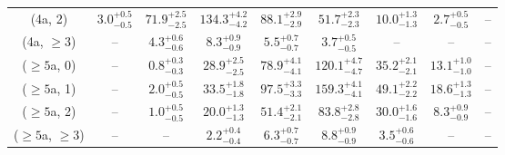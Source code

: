 \begin{table}[h!]
{\begin{tabular}{ccccccccc}
	(4a, 2) & $3.0^{+ 0.5 }_{- 0.5 }$ & $71.9^{+ 2.5 }_{- 2.5 }$ & $134.3^{+ 4.2 }_{- 4.2 }$ & $88.1^{+ 2.9 }_{- 2.9 }$ & $51.7^{+ 2.3 }_{- 2.3 }$ & $10.0^{+ 1.3 }_{- 1.3 }$ & $2.7^{+ 0.5 }_{- 0.5 }$ & -- \\[0.5ex] 
	(4a, $\ge3$) & -- & $4.3^{+ 0.6 }_{- 0.6 }$ & $8.3^{+ 0.9 }_{- 0.9 }$ & $5.5^{+ 0.7 }_{- 0.7 }$ & $3.7^{+ 0.5 }_{- 0.5 }$ & -- & -- & -- \\[0.5ex] 
	($\ge5$a, 0) & -- & $0.8^{+ 0.3 }_{- 0.3 }$ & $28.9^{+ 2.5 }_{- 2.5 }$ & $78.9^{+ 4.1 }_{- 4.1 }$ & $120.1^{+ 4.7 }_{- 4.7 }$ & $35.2^{+ 2.1 }_{- 2.1 }$ & $13.1^{+ 1.0 }_{- 1.0 }$ & -- \\[0.5ex] 
	($\ge5$a, 1) & -- & $2.0^{+ 0.5 }_{- 0.5 }$ & $33.5^{+ 1.8 }_{- 1.8 }$ & $97.5^{+ 3.3 }_{- 3.3 }$ & $159.3^{+ 4.1 }_{- 4.1 }$ & $49.1^{+ 2.2 }_{- 2.2 }$ & $18.6^{+ 1.3 }_{- 1.3 }$ & -- \\[0.5ex] 
	($\ge5$a, 2) & -- & $1.0^{+ 0.5 }_{- 0.5 }$ & $20.0^{+ 1.3 }_{- 1.3 }$ & $51.4^{+ 2.1 }_{- 2.1 }$ & $83.8^{+ 2.8 }_{- 2.8 }$ & $30.0^{+ 1.6 }_{- 1.6 }$ & $8.3^{+ 0.9 }_{- 0.9 }$ & -- \\[0.5ex] 
	($\ge5$a, $\ge3$) & -- & -- & $2.2^{+ 0.4 }_{- 0.4 }$ & $6.3^{+ 0.7 }_{- 0.7 }$ & $8.8^{+ 0.9 }_{- 0.9 }$ & $3.5^{+ 0.6 }_{- 0.6 }$ & -- & -- \\[0.5ex] 
	\hline
	\hline
\end{tabular}}
\end{table}
